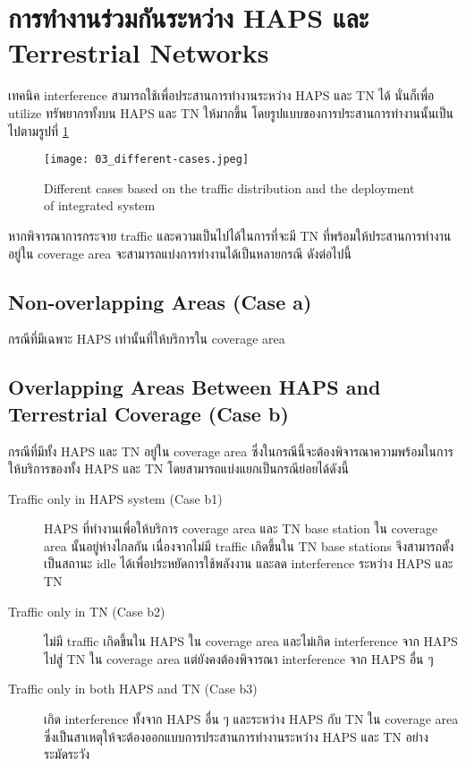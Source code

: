 \section{การทำงานร่วมกันระหว่าง HAPS และ Terrestrial Networks}

เทคนิค interference สามารถใช้เพื่อประสานการทำงานระหว่าง HAPS และ TN ได้
นั่นก็เพื่อ utilize ทรัพยากรทั้งบน HAPS และ TN ให้มากขึ้น
โดยรูปแบบของการประสานการทำงานนั้นเป็นไปตามรูปที่ \ref{fig:03-different-cases}

\begin{figure}[h]
\centering
\texttt{[image: 03\_different-cases.jpeg]}
\caption[Different interference cases]{Different cases based on the traffic distribution and the deployment of integrated system} \label{fig:03-different-cases}
\end{figure}

หากพิจารณาการกระจาย traffic และความเป็นไปได้ในการที่จะมี TN ที่พร้อมให้ประสานการทำงานอยู่ใน coverage area
จะสามารถแบ่งการทำงานได้เป็นหลายกรณี ดังต่อไปนี้

\subsection{Non-overlapping Areas (Case a)}

กรณีที่มีเฉพาะ HAPS เท่านั้นที่ให้บริการใน coverage area

\subsection{Overlapping Areas Between HAPS and Terrestrial Coverage (Case b)}

กรณีที่มีทั้ง HAPS และ TN อยู่ใน coverage area ซึ่งในกรณีนี้จะต้องพิจารณาความพร้อมในการให้บริการของทั้ง
HAPS และ TN โดยสามารถแบ่งแยกเป็นกรณีย่อยได้ดังนี้

\begin{description}
    \item[Traffic only in HAPS system (Case b1)] HAPS ที่ทำงานเพื่อให้บริการ coverage area และ TN base station ใน coverage area นั้นอยู่ห่างไกลกัน
เนื่องจากไม่มี traffic เกิดขึ้นใน TN base stations จึงสามารถตั้งเป็นสถานะ idle ได้เพื่อประหยัดการใช้พลังงาน
และลด interference ระหว่าง HAPS และ TN
    \item[Traffic only in TN (Case b2)] ไม่มี traffic เกิดขึ้นใน HAPS ใน coverage area และไม่เกิด interference จาก HAPS ไปสู่ TN ใน coverage area
แต่ยังคงต้องพิจารณา interference จาก HAPS อื่น ๆ
    \item[Traffic only in both HAPS and TN (Case b3)] เกิด interference ทั้งจาก HAPS อื่น ๆ และระหว่าง HAPS กับ TN ใน coverage area
ซึ่งเป็นสาเหตุให้จะต้องออกแบบการประสานการทำงานระหว่าง HAPS และ TN อย่างระมัดระวัง
\end{description}
